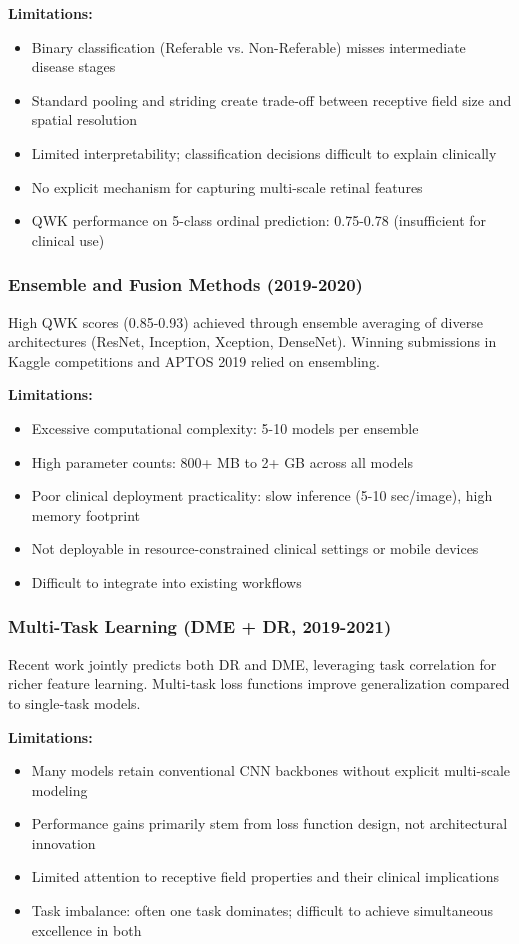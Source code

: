 \documentclass[12pt,a4paper]{article}
\begin{document}
\textbf{Limitations:}
\begin{itemize}
    \item Binary classification (Referable vs. Non-Referable) misses intermediate disease stages
    \item Standard pooling and striding create trade-off between receptive field size and spatial resolution
    \item Limited interpretability; classification decisions difficult to explain clinically
    \item No explicit mechanism for capturing multi-scale retinal features
    \item QWK performance on 5-class ordinal prediction: 0.75-0.78 (insufficient for clinical use)
\end{itemize}

\subsubsection{Ensemble and Fusion Methods (2019-2020)}

High QWK scores (0.85-0.93) achieved through ensemble averaging of diverse architectures (ResNet, Inception, Xception, DenseNet). Winning submissions in Kaggle competitions and APTOS 2019 relied on ensembling.

\textbf{Limitations:}
\begin{itemize}
    \item Excessive computational complexity: 5-10 models per ensemble
    \item High parameter counts: 800+ MB to 2+ GB across all models
    \item Poor clinical deployment practicality: slow inference (5-10 sec/image), high memory footprint
    \item Not deployable in resource-constrained clinical settings or mobile devices
    \item Difficult to integrate into existing workflows
\end{itemize}

\subsubsection{Multi-Task Learning (DME + DR, 2019-2021)}

Recent work jointly predicts both DR and DME, leveraging task correlation for richer feature learning. Multi-task loss functions improve generalization compared to single-task models.

\textbf{Limitations:}
\begin{itemize}
    \item Many models retain conventional CNN backbones without explicit multi-scale modeling
    \item Performance gains primarily stem from loss function design, not architectural innovation
    \item Limited attention to receptive field properties and their clinical implications
    \item Task imbalance: often one task dominates; difficult to achieve simultaneous excellence in both
\end{itemize}
\end{document}
